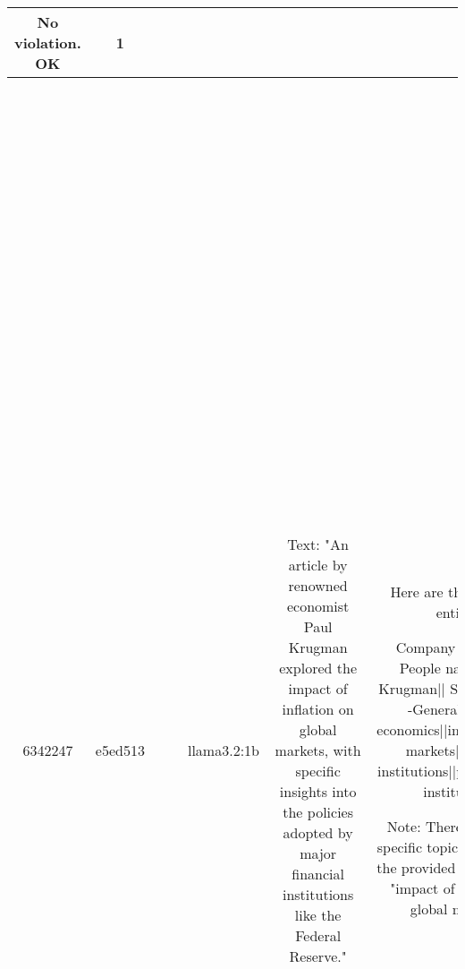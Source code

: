 \begin{table}[h!]
\begin{tabular}{|c|c|c|c|c|c|c|c|c|c|}
No violation.
OK & 1\\
\hline
6342247 & e5ed513 &  &  & llama3.2:1b & Text: "An article by renowned economist Paul Krugman explored the impact of inflation on global markets, with specific insights into the policies adopted by major financial institutions like the Federal Reserve." & Here are the extracted entities:

Company names: -||-
People names: Paul Krugman||
Specific topics: 
-General themes: economics||inflation||global markets||financial institutions||policy)||major institutions|

Note: There is only one specific topic mentioned in the provided text, which is "impact of inflation on global markets". & err & The chatbot output exhibits issues in the format and consistency as per the description. Specifically, the section for "Company names" uses a different format ('-||-'), which is not consistent with how other sections like "People names" and "General themes" are formatted (using `||` as separators). Additionally, the "Specific topics" section is missing any extracted topics despite having an explanatory note below indicating a specific topic, which seems contradictory. Furthermore, the formatting issues with brackets and inconsistent use of separators in the "General themes" section detract from the compliant output, indicating errors in maintaining the required structure and format consistency.

ERR & 1\\
\hline
133efc8 & e5ed513 &  &  & llama3.2:1b & Text: "Netflix's new series on the life of Princess Diana received attention for its portrayal of the British monarchy. Theme of royal family history and media representation were central to the series." & Company names: <none>
People names: Charles, Prince of Wales , Diana, Princess of Wales
Specific topics: royal family history, media representation, British monarchy
General themes: 
- Focus on Princess Diana's life and role in British royalty & err & The chatbot output must adhere to a specific format as provided in the description. The output should include sections for company names, people names, specific topics, and general themes, each presented in the format specified. In this output:

1. **Company names** section includes "<none>", which fits the expectation if no company names were mentioned.

2. **People names** section lists two names, both separated by commas, complying with the description format.


\end{tabular}
\end{table}
